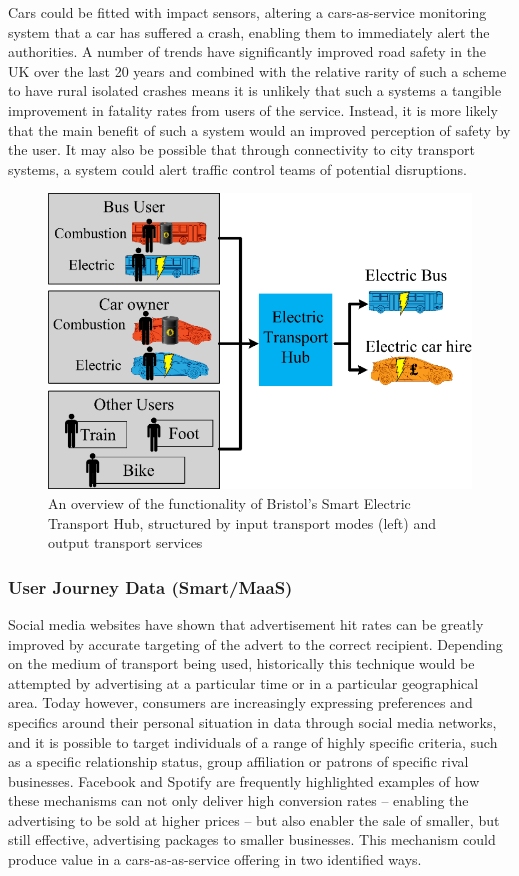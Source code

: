 \documentclass[b5paper,10pt]{article}
\begin{document}
Cars could be fitted with impact sensors, altering a cars-as-service
monitoring system that a car has suffered a crash, enabling them to
immediately alert the authorities. A number of trends have
significantly improved road safety in the UK over the last 20 years
and combined with the relative rarity of such a scheme to have rural
isolated crashes means it is unlikely that such a systems a tangible
improvement in fatality rates from users of the service. Instead, it
is more likely that the main benefit of such a system would an
improved perception of safety by the user. It may also be possible
that through connectivity to city transport systems, a system could
alert traffic control teams of potential disruptions.

\begin{figure}[htb]
\centering
\includegraphics[width=0.75\columnwidth]{images/bristolhub.png}
\caption{An overview of the functionality of Bristol's Smart Electric
  Transport Hub, structured by input transport modes (left) and output
  transport services}
\label{fig:bristolhub}
\end{figure}


\subsubsection{User Journey Data (Smart/MaaS)}

Social media websites have shown that advertisement hit rates can be
greatly improved by accurate targeting of the advert to the correct
recipient. Depending on the medium of transport being used,
historically this technique would be attempted by advertising at a
particular time or in a particular geographical area. Today however,
consumers are increasingly expressing preferences and specifics around
their personal situation in data through social media networks, and it
is possible to target individuals of a range of highly specific
criteria, such as a specific relationship status, group affiliation or
patrons of specific rival businesses.  Facebook and Spotify are
frequently highlighted examples of how these mechanisms can not only
deliver high conversion rates -- enabling the advertising to be sold at
higher prices -- but also enabler the sale of smaller, but still
effective, advertising packages to smaller businesses. This mechanism
could produce value in a cars-as-as-service offering in two identified
ways.
\end{document}
